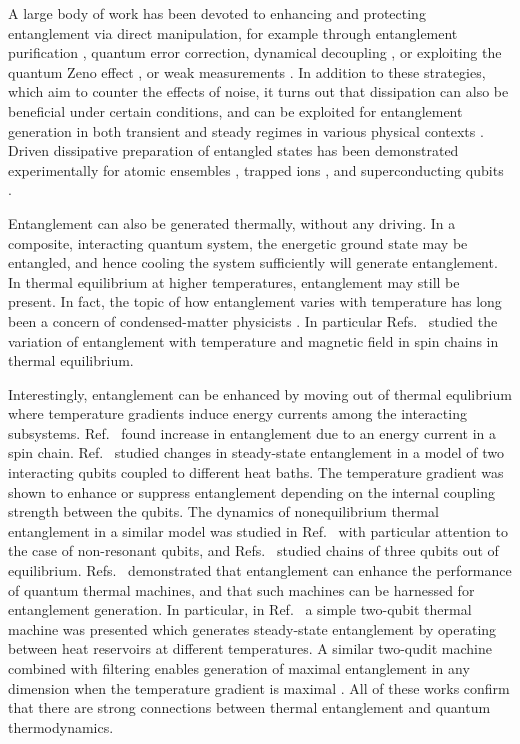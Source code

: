 \documentclass[12pt]{iopart}
\begin{document}
A large body of work has been devoted to enhancing and protecting entanglement via direct manipulation, for example through entanglement purification \cite{pur1,pur2,pur3}, quantum error correction\cite{error-corr1,error-corr2}, dynamical decoupling \cite{DD1,DD2,DD3}, or exploiting the quantum Zeno effect \cite{Zeno1,Zeno2}, or weak measurements \cite{weak1,weak2,weak3,weak4}. In addition to these strategies, which aim to counter the effects of noise, it turns out that dissipation can also be beneficial under certain conditions, and can be exploited for entanglement generation in both transient and steady regimes \cite{diss-pre1,diss-pre2,diss-pre3,diss-pre4,diss-pre5,diss-pre6} in various physical contexts \cite{phys-sys7,phys-sys1,phys-sys2,phys-sys3,phys-sys4,phys-sys5,phys-sys6}. Driven dissipative preparation of entangled states has been demonstrated experimentally for atomic ensembles \cite{atom}, trapped ions \cite{ion1,ion2}, and superconducting qubits \cite{super}.

Entanglement can also be generated thermally, without any driving. In a composite, interacting quantum system, the energetic ground state may be entangled, and hence cooling the system sufficiently will generate entanglement. In thermal equilibrium at higher temperatures, entanglement may still be present. In fact, the topic of how entanglement varies with temperature has long been a concern of condensed-matter physicists \cite{equi1,equi2,equi3,equi4,equi5,equi6,equi7}. In particular Refs.~\cite{equi1,equi2,equi3,equi4} studied the variation of entanglement with temperature and magnetic field in spin chains in thermal equilibrium.

Interestingly, entanglement can be enhanced by moving out of thermal equlibrium where temperature gradients induce energy currents among the interacting subsystems. Ref.~\cite{nonequi1} found increase in entanglement due to an energy current in a  spin chain. Ref.~\cite{nonequi2} studied changes in steady-state entanglement in a model of two interacting qubits coupled to different heat baths. The temperature gradient was shown to enhance or suppress entanglement depending on the internal coupling strength between the qubits. The dynamics of nonequilibrium thermal entanglement in a similar model was studied in Ref.~\cite{nonequi3} with particular attention to the case of non-resonant qubits, and Refs.~\cite{nonequi4,nonequi5} studied chains of three qubits out of equilibrium. Refs.~\cite{Brunner2014,BraskPRE2015,Brask2015,Tavakoli2017} demonstrated that entanglement can enhance the performance of quantum thermal machines, and that such machines can be harnessed for entanglement generation. In particular, in Ref.~\cite{Brask2015} a simple two-qubit thermal machine was presented which generates steady-state entanglement by operating between heat reservoirs at different temperatures. A similar two-qudit machine combined with filtering enables generation of maximal entanglement in any dimension when the temperature gradient is maximal \cite{Tavakoli2017}. All of these works confirm that there are strong connections between thermal entanglement and quantum thermodynamics.
\end{document}
